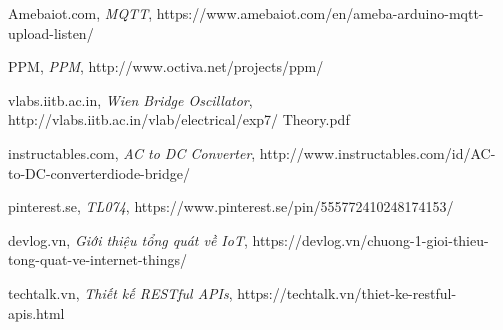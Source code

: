 \documentclass[a4paper,12pt,oneside]{article}
\begin{document}
\begin{thebibliography}{80}
 Amebaiot.com,
\textit{MQTT}, https://www.amebaiot.com/en/ameba-arduino-mqtt-upload-listen/
		
 PPM,
\textit{PPM}, http://www.octiva.net/projects/ppm/

 vlabs.iitb.ac.in,
\textit{Wien Bridge Oscillator}, http://vlabs.iitb.ac.in/vlab/electrical/exp7/ Theory.pdf

 instructables.com,
\textit{AC to DC Converter}, http://www.instructables.com/id/AC-to-DC-converterdiode-bridge/

 pinterest.se,
\textit{TL074}, https://www.pinterest.se/pin/555772410248174153/

 devlog.vn,
\textit{Giới thiệu tổng quát về IoT}, https://devlog.vn/chuong-1-gioi-thieu-tong-quat-ve-internet-things/

 techtalk.vn,
\textit{Thiết kế RESTful APIs}, https://techtalk.vn/thiet-ke-restful-apis.html


\end{thebibliography}
\end{document}

